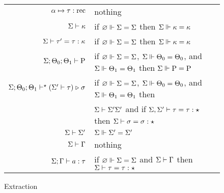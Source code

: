 \documentclass{article}
\begin{document}
\begin{figure}
\begin{center}
\begin{tabular}{r@{$\;\;\mapsto\;\;$}l}
$\alpha \mapsto \tau : \mathrm{rec}$ & nothing \\
$\Sigma \vdash \kappa$ & if $\varnothing \Vdash \Sigma = \Sigma$ then $\Sigma \Vdash \kappa = \kappa$ \\
$\Sigma \vdash \tau' = \tau : \kappa$ & if $\varnothing \Vdash \Sigma = \Sigma$ then $\Sigma \Vdash \kappa = \kappa$ \\
$\Sigma ; \Theta_0 ; \Theta_1 \vdash \mathrm{P}$ &
  if $\varnothing \Vdash \Sigma = \Sigma$, $\Sigma \Vdash \Theta_0 = \Theta_0$, and $\Sigma \Vdash \Theta_1 =
  \Theta_1$ then $\Sigma \Vdash \mathrm{P} = \mathrm{P}$ \\
$\Sigma ; \Theta_0 ; \Theta_1 \vdash^\star (\Sigma' \vdash \tau) \mathrel\triangleright \sigma$ &
  if $\varnothing \Vdash \Sigma = \Sigma$, $\Sigma \Vdash \Theta_0 = \Theta_0$, and $\Sigma \Vdash \Theta_1 = \Theta_1$ then \\
  & $\Sigma \vdash \Sigma' \Sigma'$ and
  if $\Sigma, \Sigma' \vdash \tau = \tau : \star$ then $\Sigma \vdash \sigma = \sigma : \star$ \\
$\Sigma \vdash \Sigma'$ & $\Sigma \Vdash \Sigma' = \Sigma'$ \\
$\Sigma \vdash \Gamma$ & nothing \\
$\Sigma ; \Gamma \vdash a : \tau$ & if $\varnothing \Vdash \Sigma = \Sigma$ and $\Sigma \vdash \Gamma$
  then $\Sigma \vdash \tau = \tau : \star$ \\
\end{tabular}
\end{center}
\caption{Extraction}
\label{fig:extraction}
\end{figure}
\end{document}
